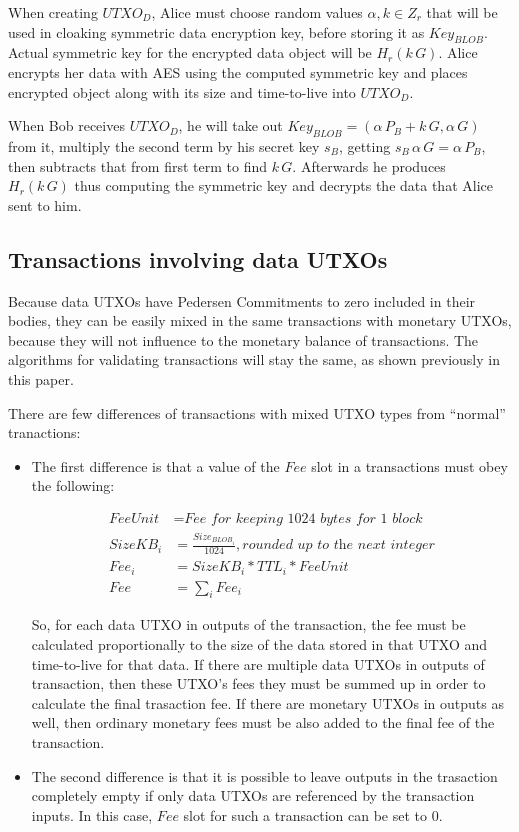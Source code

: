 \documentclass[a4paper, 10pt, conference]{ieeeconf}
\begin{document}
When creating $UTXO_D$, Alice must choose random values $\alpha, k \in Z_r$ that will be used in cloaking symmetric data encryption key, before storing it as $Key_{BLOB}$. Actual symmetric key for the encrypted data object will be $H_r(k \, G)$. Alice encrypts her data with AES using the computed symmetric key and places encrypted object along with its size and time-to-live into $UTXO_D$.

When Bob receives $UTXO_D$, he will take out $Key_{BLOB} = (\alpha \, P_{B} + k \, G, \alpha \, G )$ from it, multiply the second term by his secret key $s_B$, getting $s_B \, \alpha \, G = \alpha \, P_B$, then subtracts that from first term to find $k \, G$. Afterwards he produces $H_r(k \, G)$ thus computing the symmetric key and decrypts the data that Alice sent to him.

\subsection{Transactions involving data UTXOs}

Because data UTXOs have Pedersen Commitments to zero included in their bodies, they can be easily mixed in the same transactions with monetary UTXOs, because they will not influence to the monetary balance of transactions. The algorithms for validating transactions will stay the same, as shown previously in this paper.

There are few differences of transactions with mixed UTXO types from ``normal'' tranactions:

\begin{itemize}

	\item{The first difference is that a value of the $Fee$ slot in a transactions must obey the following:

	\begin{align*}
		FeeUnit &= \textit{Fee for keeping 1024 bytes for 1 block} \\
		SizeKB_i &= \frac{Size_{BLOB_i}}{1024}, \textit{rounded up to the next integer}\\
		Fee_i &= SizeKB_i * TTL_i * FeeUnit\\
		Fee &= \sum_i Fee_i
	\end{align*}

	So, for each data UTXO in outputs of the transaction, the fee must be calculated proportionally to the size of the data stored in that UTXO and time-to-live for that data. If there are multiple data UTXOs in outputs of transaction, then these UTXO's fees they must be summed up in order to calculate the final trasaction fee. If there are monetary UTXOs in outputs as well, then ordinary monetary fees must be also added to the final fee of the transaction.}

	\item{The second difference is that it is possible to leave outputs in the trasaction completely empty if only data UTXOs are referenced by the transaction inputs. In this case, $Fee$ slot for such a transaction can be set to $0$.}
\end{itemize}
\end{document}
